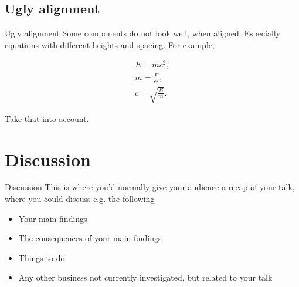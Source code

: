 \documentclass[aspectratio=169]{beamer}
\begin{document}
\subsection{Ugly alignment}
\begin{frame}{Ugly alignment}
Some components do not look well, when aligned. Especially equations with different heights and spacing. For example,

\begin{align}
    E = mc^2, \\
    m = \frac{E}{c^2}, \\
    c = \sqrt{\frac{E}{m}}.
\end{align}

Take that into account.
\end{frame}

\section{Discussion}
\begin{frame}{Discussion}
This is where you’d normally give your audience a recap of your talk, where you could discuss e.g. the following

\begin{itemize}
    \item Your main findings 
    \item The consequences of your main findings
    \item Things to do 
    \item Any other business not currently investigated, but related to your talk
\end{itemize}
    
\end{frame}
\end{document}
